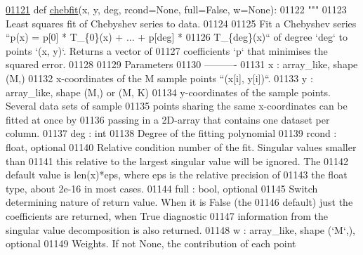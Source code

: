 \begin{DoxyCode}
\hypertarget{namespacepyneb_1_1utils_1_1chebyshev_l01121}{}\hyperlink{namespacepyneb_1_1utils_1_1chebyshev_a6bb5eb95525fd0572aea52fcd2a12c6c}{01121} \textcolor{keyword}{def }\hyperlink{namespacepyneb_1_1utils_1_1chebyshev_a6bb5eb95525fd0572aea52fcd2a12c6c}{chebfit}(x, y, deg, rcond=None, full=False, w=None):
01122     \textcolor{stringliteral}{"""}
01123 \textcolor{stringliteral}{    Least squares fit of Chebyshev series to data.}
01124 \textcolor{stringliteral}{}
01125 \textcolor{stringliteral}{    Fit a Chebyshev series ``p(x) = p[0] * T\_\{0\}(x) + ... + p[deg] *}
01126 \textcolor{stringliteral}{    T\_\{deg\}(x)`` of degree `deg` to points `(x, y)`. Returns a vector of}
01127 \textcolor{stringliteral}{    coefficients `p` that minimises the squared error.}
01128 \textcolor{stringliteral}{}
01129 \textcolor{stringliteral}{    Parameters}
01130 \textcolor{stringliteral}{    ----------}
01131 \textcolor{stringliteral}{    x : array\_like, shape (M,)}
01132 \textcolor{stringliteral}{        x-coordinates of the M sample points ``(x[i], y[i])``.}
01133 \textcolor{stringliteral}{    y : array\_like, shape (M,) or (M, K)}
01134 \textcolor{stringliteral}{        y-coordinates of the sample points. Several data sets of sample}
01135 \textcolor{stringliteral}{        points sharing the same x-coordinates can be fitted at once by}
01136 \textcolor{stringliteral}{        passing in a 2D-array that contains one dataset per column.}
01137 \textcolor{stringliteral}{    deg : int}
01138 \textcolor{stringliteral}{        Degree of the fitting polynomial}
01139 \textcolor{stringliteral}{    rcond : float, optional}
01140 \textcolor{stringliteral}{        Relative condition number of the fit. Singular values smaller than}
01141 \textcolor{stringliteral}{        this relative to the largest singular value will be ignored. The}
01142 \textcolor{stringliteral}{        default value is len(x)*eps, where eps is the relative precision of}
01143 \textcolor{stringliteral}{        the float type, about 2e-16 in most cases.}
01144 \textcolor{stringliteral}{    full : bool, optional}
01145 \textcolor{stringliteral}{        Switch determining nature of return value. When it is False (the}
01146 \textcolor{stringliteral}{        default) just the coefficients are returned, when True diagnostic}
01147 \textcolor{stringliteral}{        information from the singular value decomposition is also returned.}
01148 \textcolor{stringliteral}{    w : array\_like, shape (`M`,), optional}
01149 \textcolor{stringliteral}{        Weights. If not None, the contribution of each point}

\end{DoxyCode}

